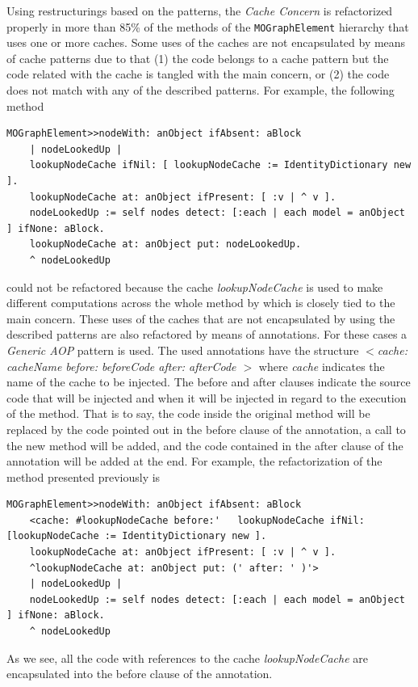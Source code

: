 \documentclass[preprint,10pt]{sigplanconf}
\newcommand{\ct}{\lstinline[backgroundcolor=\color{white},basicstyle=\footnotesize\ttfamily]}
\begin{document}
Using restructurings based on the patterns, the \emph{Cache Concern} is refactorized
properly in more than 85\% of the methods of the \ct{MOGraphElement} hierarchy that uses one or more caches.
Some uses of the caches are not encapsulated by means of 
cache patterns due to that (1) the code belongs to a cache pattern but the code related with the cache is tangled with the main concern, or (2) the code does not match with any of the described patterns. For example, the following method
\begin{lstlisting} 
MOGraphElement>>nodeWith: anObject ifAbsent: aBlock  
	| nodeLookedUp |
	lookupNodeCache ifNil: [ lookupNodeCache := IdentityDictionary new ].
	lookupNodeCache at: anObject ifPresent: [ :v | ^ v ].
	nodeLookedUp := self nodes detect: [:each | each model = anObject ] ifNone: aBlock.
	lookupNodeCache at: anObject put: nodeLookedUp.
	^ nodeLookedUp
\end{lstlisting}
could not be refactored because the cache \emph{lookupNodeCache} is used to make different computations across the whole
method by which is closely tied to the main concern. 
These uses of the caches that are not encapsulated
by using the described patterns are also refactored by means of annotations. For these cases
a \emph{Generic AOP} pattern is used. The used annotations have the structure
\emph{$<$cache: cacheName before: beforeCode after: afterCode $>$} where \emph{cache}
indicates the name of the cache to be injected. The before and after clauses
 indicate the source code that will be injected and
when it will be injected in regard to the execution of the method.
That is to say, the code inside the original method will be replaced
by the code pointed out in the before clause of the annotation, a call
to the new method will be added, and the code contained in the after
clause of the annotation will be added at the end. For example, the refactorization of the method presented previously is
\begin{lstlisting} 
MOGraphElement>>nodeWith: anObject ifAbsent: aBlock  
	<cache: #lookupNodeCache before:'	lookupNodeCache ifNil: [lookupNodeCache := IdentityDictionary new ]. 			
	lookupNodeCache at: anObject ifPresent: [ :v | ^ v ]. 
	^lookupNodeCache at: anObject put: (' after: ' )'>
	| nodeLookedUp |
	nodeLookedUp := self nodes detect: [:each | each model = anObject ] ifNone: aBlock.
	^ nodeLookedUp
\end{lstlisting}
As we see, all the code with references to the cache  \emph{lookupNodeCache} are encapsulated into the before clause of the annotation.
\end{document}
